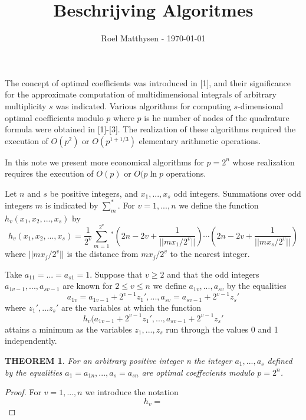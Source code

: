 \documentclass[a4paper, 12pt]{article}
\title{Beschrijving Algoritmes}
\author{Roel Matthysen - \today}
\date{}
\newtheorem{mydef}{THEOREM}
\begin{document}
\maketitle
The concept of optimal coefficients was introduced in [1], and their significance for the approximate computation of multidimensional integrals of arbitrary multiplicity $s$ was indicated. Various algorithms for computing $s$-dimensional optimal coefficients modulo $p$ where $p$ is he number of nodes of the quadrature formula were obtained in [1]-[3]. The realization of these algorithms required the execution of $O(p^2)$ or $O(p^{1+1/3})$ elementary arithmetic operations.

In this note we present more economical algorithms for $p=2^n$ whose realization requires the execution of $O(p)$ or $O(p\ln{p}$ operations.

Let $n$ and $s$ be positive integers, and $x_1,...,x_s$ odd integers. Summations over odd integers $m$ is indicated by $\sum_m^*$. For $v=1,...,n$ we define the function $h_v(x_1,x_2,...,x_s)$ by
 \begin{equation}
h_v(x_1,x_2,...,x_s)=\frac{1}{2^v}\sum_{m=1}^{2^v}{}^*\left(2n-2v+\frac{1}{||mx_1/2^v||}\right)\cdots\left(2n-2v+\frac{1}{||mx_s/2^v||}\right)
\end{equation}
where $||mx_j/2^v||$ is the distance from $mx_j/2^v$ to the nearest integer. 

Take $a_{11}=...=a_{s1}=1$. Suppose that $v\ge2$ and that the odd integers $a_{1v-1},...,a_{sv-1}$ are known for $2\le v \le n$ we define $a_{1v},...,a_{sv}$ by the equalities
\begin{equation}
a_{1v}=a_{1v-1}+2^{v-1}z_1',...,a_{sv}=a_{sv-1}+2^{v-1}z_s'
\end{equation} 
where $z_1',...z_s'$ are the variables at which the function
\begin{equation}
h_v(a_{1v-1}+2^{v-1}z_1',...,a_{sv-1}+2^{v-1}z_s'
\end{equation}
attains a minimum as the variables $z_1,...,z_s$ run through the values 0 and 1 independently.
\begin{mydef}
For an arbitrary positive integer n the integer $a_1,...,a_s$ defined by the equalities $a_1=a_{1n},...,a_s=a_{sn}$ are optimal coeffecients modulo $p=2^n$.
\end{mydef}
\begin{proof}
For $v=1,...,n$ we introduce the notation
\begin{equation}
h_v=
\end{equation}
\end{proof}
\end{document}
